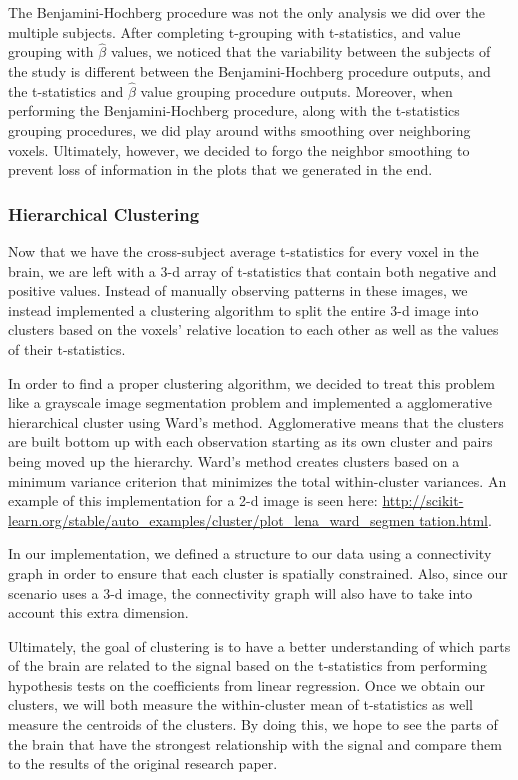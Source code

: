 \par The Benjamini-Hochberg procedure was not the only analysis we did over the
multiple subjects. After completing t-grouping with t-statistics, and value 
grouping with $\hat{\beta}$ values, we noticed that the variability between the
subjects of the study is different between the Benjamini-Hochberg procedure 
outputs, and the t-statistics and $\hat{\beta}$ value grouping procedure 
outputs. Moreover, when performing the Benjamini-Hochberg procedure, along with
the t-statistics grouping procedures, we did play around withs smoothing over 
neighboring voxels. Ultimately, however, we decided to forgo the neighbor 
smoothing to prevent loss of information in the plots that we generated in the 
end.

\subsubsection{Hierarchical Clustering}

\par Now that we have the cross-subject average t-statistics for every voxel 
in the brain, we are left with a 3-d array of t-statistics that contain both 
negative and positive values. Instead of manually observing patterns in these 
images, we instead implemented a clustering algorithm to split the entire 3-d 
image into clusters based on the voxels' relative location to each other as 
well as the values of their t-statistics.

\par In order to find a proper clustering algorithm, we decided to treat this
problem like a grayscale image segmentation problem and implemented a
agglomerative hierarchical cluster using Ward's method. Agglomerative means
that the clusters are built bottom up with each observation starting as its
own cluster and pairs being moved up the hierarchy. Ward's method creates
clusters based on a minimum variance criterion that minimizes the total
within-cluster variances. An example of this implementation for a 2-d image is
seen here: 
\url{http://scikit-learn.org/stable/auto_examples/cluster/plot_lena_ward_segmen
tation.html}.

In our implementation, we defined a structure to our data using a connectivity
graph in order to ensure that each cluster is spatially constrained. Also,
since our scenario uses a 3-d image, the connectivity graph will also have to
take into account this extra dimension.


\par Ultimately, the goal of clustering is to have a better understanding of 
which parts of the brain are related to the signal based on the t-statistics 
from performing hypothesis tests on the coefficients from linear regression.
Once we obtain our clusters, we will both measure the within-cluster mean of
t-statistics as well measure the centroids of the clusters. By doing this, we 
hope to see the parts of the brain that have the strongest relationship with 
the signal and compare them to the results of the original research paper.

